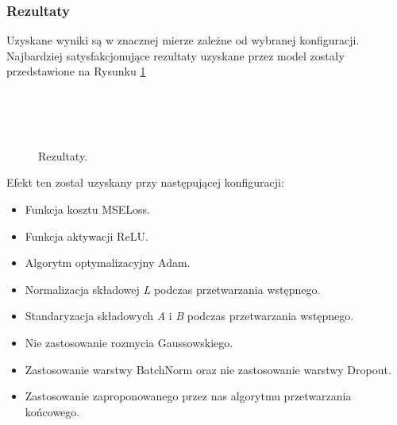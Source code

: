 \subsubsection{Rezultaty} \label{Rezultaty}

 Uzyskane wyniki są w znacznej mierze zależne od wybranej konfiguracji.
 Najbardziej satysfakcjonujące rezultaty uzyskane przez model zostały
 przedstawione na Rysunku \ref{fig:best_result}

 \begin{figure}[ht]
   \centering
   \captionsetup{justification=centering}
    \\
    \\
    \\
   \caption[Efekty działania sieci - źródło: Rysunek własny bazujący na:
   \url{https://fr.m.wikipedia.org/wiki/Fichier:An_F-A-18C_Hornet_launches_from_the_flight_deck_of_the_conventionally_powered_aircraft_carrier.jpg},
   \url{https://pl.wikipedia.org/wiki/Plik:PL_Bagno_Calowanie_2.jpg}, \cite{cifar-10}]
   {Rezultaty.}
   \label{fig:best_result}
 \end{figure}

 \noindent
 Efekt ten został uzyskany przy następującej konfiguracji:
 \begin{itemize}
   \item Funkcja kosztu MSELoss.
   \item Funkcja aktywacji ReLU.
   \item Algorytm optymalizacyjny Adam.
   \item Normalizacja składowej \textit{L} podczas przetwarzania wstępnego.
   \item Standaryzacja składowych \textit{A} i \textit{B} podczas przetwarzania wstępnego.
   \item Nie zastosowanie rozmycia Gaussowskiego.
   \item Zastosowanie warstwy BatchNorm oraz nie zastosowanie warstwy Dropout.
   \item Zastosowanie zaproponowanego przez nas algorytmu przetwarzania końcowego.
 \end{itemize}

